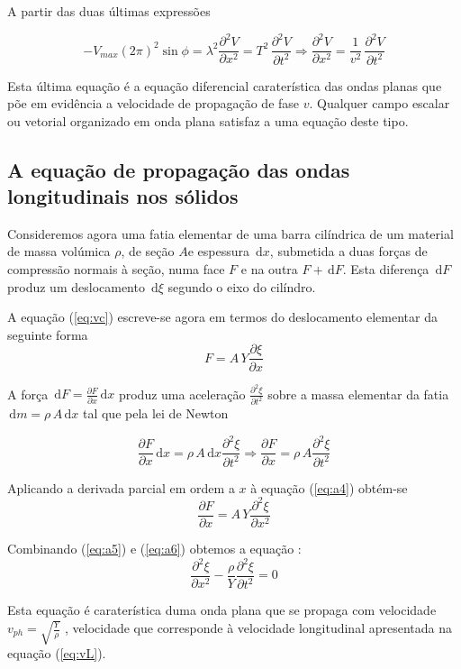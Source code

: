 \documentclass[a4paper,12pt]{article}
\newcommand{\ud}{\,\mathrm{d}}
\begin{document}
A partir das duas últimas expressões 

\begin{equation}
	\label{eq:ondap}
-V_{max} (2 \pi)^2  \sin \phi = \lambda^2 \frac{\partial^2 V }{\partial x^2} = T^2 \, \frac{\partial^2 V }{\partial t^2} \Rightarrow 
\frac{\partial^2 V }{\partial x^2} = \frac{1}{v^2}  \, \frac{\partial^2 V }{\partial t^2}
\end{equation}

Esta última equação é a equação diferencial caraterística das ondas planas que põe em evidência a velocidade de propagação de fase $v$. Qualquer campo escalar ou vetorial organizado em onda plana satisfaz a uma equação deste tipo.

\subsection{\sf A equação de propagação das ondas longitudinais nos sólidos} 

Consideremos agora uma fatia elementar de uma barra cilíndrica de um material de massa volúmica $\rho$, de seção $A$e espessura $\ud x$, submetida a duas forças de compressão normais à seção, numa face $F$ e na outra $F+\ud F$. Esta diferença $\ud F$ produz um deslocamento  $\ud \xi$  segundo o eixo do cilíndro.

A equação (\ref{eq:vc}) escreve-se agora em termos do deslocamento elementar da seguinte forma
\begin{equation}
	\label{eq:a4}
	 F = A \, Y \frac{\partial \xi }{\partial x} 
\end{equation}

A força $ \ud F = \frac{\partial F }{\partial x} \ud x $   produz uma aceleração $\frac{\partial^2 \xi }{\partial t^2} $  sobre a massa elementar da fatia $\ud m= \rho\,A \ud x $  tal que pela lei de Newton

\begin{equation}
	\label{eq:a5}
	 \frac{\partial F }{\partial x} \ud x  =  \rho\,A \ud x \frac{\partial^2 \xi }{\partial t^2} \Rightarrow \frac{\partial F }{\partial x} = \rho\,A  \frac{\partial^2 \xi }{\partial t^2}
\end{equation}

Aplicando a derivada parcial em ordem a $x$ à equação (\ref{eq:a4}) obtém-se
\begin{equation}
	\label{eq:a6}
	\frac{\partial F }{\partial x} = A \, Y \frac{\partial^2 \xi }{\partial x^2}
\end{equation}	

Combinando (\ref{eq:a5}) e (\ref{eq:a6}) obtemos a equação :
\begin{equation}
	\label{eq:a7}
	\frac{\partial^2 \xi }{\partial x^2} - \frac{\rho}{Y} \frac{\partial^2 \xi }{\partial t^2} =0
\end{equation}	

Esta equação é caraterística duma onda plana que se propaga com velocidade $v_{ph}=\sqrt{\frac{Y}{\rho}}$  , velocidade que corresponde à velocidade longitudinal apresentada na equação (\ref{eq:vL}). 
\end{document}
